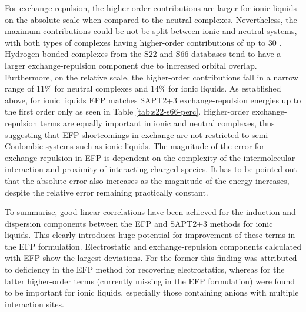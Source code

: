 For exchange-repulsion, the higher-order contributions are larger for ionic liquids on the absolute scale when compared to the neutral complexes.
Nevertheless, the maximum contributions could be not be split between ionic and neutral systems, with both types of complexes having higher-order contributions of up to 30 \enUnit.
Hydrogen-bonded complexes from the S22 and S66 databases tend to have a larger exchange-repulsion component due to increased orbital overlap.
Furthermore, on the relative scale, the higher-order contributions fall in a narrow range of 11\% for neutral complexes and 14\% for ionic liquids.
As established above, for ionic liquids EFP matches SAPT2+3 exchange-repulsion energies up to the first order only as seen in Table \ref{tab:s22-s66-perc}.
Higher-order exchange-repulsion terms are equally important in ionic and neutral complexes, thus suggesting that EFP shortcomings in exchange are not restricted to semi-Coulombic systems such as ionic liquids.
The magnitude of the error for exchange-repulsion in EFP is dependent on the complexity of the intermolecular interaction and proximity of interacting charged species. 
It has to be pointed out that the absolute error also increases as the magnitude of the energy increases, despite the relative error remaining practically constant.

To summarise, good linear correlations have been achieved for the induction and dispersion components between the EFP and SAPT2+3 methods for ionic liquids. This clearly introduces huge potential for improvement of these terms in the EFP formulation. Electrostatic and exchange-repulsion components calculated with EFP show the largest deviations. For the former this finding was attributed to deficiency in the EFP method for recovering electrostatics, whereas for the latter higher-order terms (currently missing in the EFP formulation) were found to be important for ionic liquids, especially those containing anions with multiple interaction sites.   




